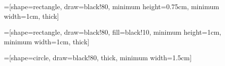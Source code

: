 \raggedbottom  %

\usepackage{graphicx}
\graphicspath{{graphics/}}


\usepackage{ucs}        %
\usepackage[utf8x]{inputenc}   %
\usepackage{cancel}                       %
\usepackage{helvet}
\usepackage{booktabs}  %
\usepackage{units} %
\usepackage{amssymb}
\usepackage{amsmath} %
\usepackage{wrapfig}
\usepackage{hyperref}
\usepackage{lineno}

\usepackage{tikz}
=[shape=rectangle,
                 draw=black!80,
                 minimum height=0.75cm,
                 minimum width=1cm,
                 thick]

=[shape=rectangle,
                 draw=black!80,
                 fill=black!10,
                 minimum height=1cm,
                 minimum width=1cm,
                 thick]

=[shape=circle,
                  draw=black!80,
                  thick,
                  minimum width=1.5cm]
\usepackage{natbib} %
